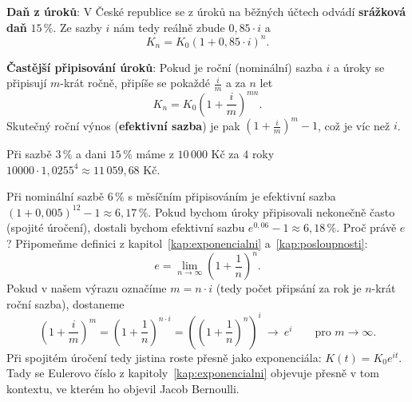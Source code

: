 \begin{definitionbox}
  \textbf{Daň z úroků}: V České republice se z úroků na běžných účtech odvádí \textbf{srážková daň} $15\,\%$. Ze sazby $i$ nám tedy reálně zbude $0{,}85\cdot i$ a
  \begin{equation*}
    K_n = K_0{(1 + 0{,}85\cdot i)}^n.
  \end{equation*}

  \textbf{Častější připisování úroků}: Pokud je roční (nominální) sazba $i$ a úroky se připisují $m$-krát ročně, připíše se pokaždé $\frac{i}{m}$ a za $n$ let
  \begin{equation*}
    K_n = K_0{\left(1 + \frac{i}{m}\right)}^{mn}.
  \end{equation*}
  Skutečný roční výnos (\textbf{efektivní sazba}) je pak ${\left(1 + \frac{i}{m}\right)}^m - 1$, což je víc než $i$.
\end{definitionbox}

\begin{example}\label{ex:efektivni-sazba}
  Při sazbě $3\,\%$ a dani $15\,\%$ máme z $10\,000$ Kč za $4$ roky $10000\cdot 1{,}0255^4\approx 11\,059{,}68$ Kč.

  Při nominální sazbě $6\,\%$ s měsíčním připisováním je efektivní sazba ${(1 + 0{,}005)}^{12} - 1\approx 6{,}17\,\%$. Pokud bychom úroky připisovali nekonečně často (spojité úročení), dostali bychom efektivní sazbu $e^{0{,}06} - 1\approx 6{,}18\,\%$. Proč právě $e$? Připomeňme definici z kapitol~\ref{kap:exponencialni} a~\ref{kap:posloupnosti}:
  \begin{equation*}
    e = \lim_{n\to\infty}{\left(1 + \frac{1}{n}\right)}^n.
  \end{equation*}
  Pokud v našem výrazu označíme $m = n\cdot i$ (tedy počet připsání za rok je $n$-krát roční sazba), dostaneme
  \begin{equation*}
    {\left(1 + \frac{i}{m}\right)}^m = {\left(1 + \frac{1}{n}\right)}^{n\cdot i} = {\left({\left(1 + \frac{1}{n}\right)}^n\right)}^i\ \longrightarrow\ e^i\qquad\text{pro } m\to\infty.
  \end{equation*}
  Při spojitém úročení tedy jistina roste přesně jako exponenciála: $K(t) = K_0e^{it}$. Tady se Eulerovo číslo z kapitoly~\ref{kap:exponencialni} objevuje přesně v tom kontextu, ve kterém ho objevil Jacob Bernoulli.
\end{example}

